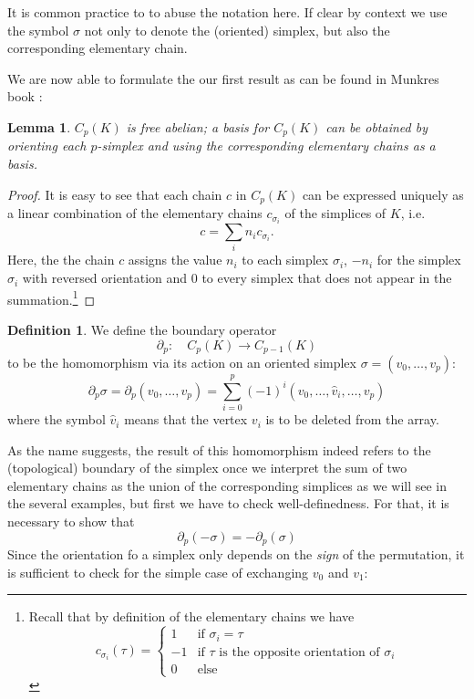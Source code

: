 \documentclass[draft,toc=bib]{scrartcl}
\theoremstyle{plain}
\newtheorem{lemma}[theorem]{Lemma}
\theoremstyle{definition}
\newtheorem	{definition}[theorem]{Definition}
\theoremstyle{remark}
\begin{document}
It is common practice to to abuse the notation here. If clear by context we use the symbol $\sigma$ not only to denote the (oriented) simplex, but also the corresponding elementary chain.

We are now able to formulate the our first result as can be found in Munkres book \cite[Lemma 5.1, p. 28]{mu}:
\begin{lemma}
	$C_p(K)$ is free abelian; a basis for $C_p(K)$ can be obtained by orienting each $p$-simplex and using the corresponding elementary chains as a basis.
\end{lemma}

\begin{proof}
	It is easy to see that each chain $c$ in $C_p(K)$ can be expressed uniquely as a linear combination of the elementary chains $c_{\sigma_i}$ of the simplices of $K$, i.e.
	\[
	c=\sum_{i}n_i c_{\sigma_i}.
	\]
	Here, the the chain $c$ assigns the value $n_i$ to each simplex $\sigma_i$, $-n_i$ for the simplex $\sigma_i$ with reversed orientation and $0$ to every simplex that does not appear in the summation.\footnote{Recall that by definition of the elementary chains we have \[c_{\sigma_i}(\tau)=\begin{cases}
		1 &\text{if }\sigma_i=\tau\\
		-1&\text{if }\tau \text{ is the opposite orientation of }\sigma_i\\
		0&\text{else}
		\end{cases}
		\]}
\end{proof}

\begin{definition}
	We define the boundary operator 
	\[
	\partial_p:\quad C_p(K)\to C_{p-1}(K)
	\]
	to be the homomorphism via its action on an oriented simplex $\sigma=(v_0,\dots,v_p)$:
	\[
	\partial_p\sigma=\partial_p(v_0,\dots,v_p)=\sum_{i=0}^{p}(-1)^i(v_0,\dots,\hat{v}_i,\dots,v_p)
	\]
	where the symbol $\hat{v}_i$ means that the vertex $v_i$ is to be deleted from the array.
\end{definition}

As the name suggests, the result of this homomorphism indeed refers to the (topological) boundary of the simplex once we interpret the sum of two elementary chains as the union of the corresponding simplices as we will see in the several examples, but first we have to check well-definedness. For that, it is necessary to show that
\[\partial_p(-\sigma)=-\partial_p(\sigma) 
\]
Since the orientation fo a simplex only depends on the \emph{sign} of the permutation, it is sufficient to check for the simple case of exchanging $v_0$ and $v_1$:
\end{document}
